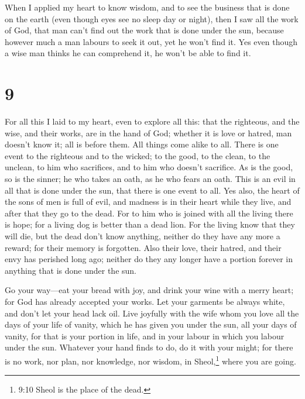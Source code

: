  When I applied my heart to know wisdom, and to see the
business that is done on the earth (even though eyes see no sleep day or
night),  then I saw all the work of God, that man can't
find out the work that is done under the sun, because however much a man
labours to seek it out, yet he won't find it. Yes even though a wise man
thinks he can comprehend it, he won't be able to find it.

\hypertarget{section-8}{%
\section{9}\label{section-8}}

 For all this I laid to my heart, even to explore all this:
that the righteous, and the wise, and their works, are in the hand of
God; whether it is love or hatred, man doesn't know it; all is before
them.  All things come alike to all. There is one event to
the righteous and to the wicked; to the good, to the clean, to the
unclean, to him who sacrifices, and to him who doesn't sacrifice. As is
the good, so is the sinner; he who takes an oath, as he who fears an
oath.  This is an evil in all that is done under the sun,
that there is one event to all. Yes also, the heart of the sons of men
is full of evil, and madness is in their heart while they live, and
after that they go to the dead.  For to him who is joined
with all the living there is hope; for a living dog is better than a
dead lion.  For the living know that they will die, but the
dead don't know anything, neither do they have any more a reward; for
their memory is forgotten.  Also their love, their hatred,
and their envy has perished long ago; neither do they any longer have a
portion forever in anything that is done under the sun.

 Go your way---eat your bread with joy, and drink your wine
with a merry heart; for God has already accepted your works.
 Let your garments be always white, and don't let your head
lack oil.  Live joyfully with the wife whom you love all the
days of your life of vanity, which he has given you under the sun, all
your days of vanity, for that is your portion in life, and in your
labour in which you labour under the sun.  Whatever your
hand finds to do, do it with your might; for there is no work, nor plan,
nor knowledge, nor wisdom, in Sheol,\footnote{9:10 Sheol is the place of
  the dead.} where you are going.

